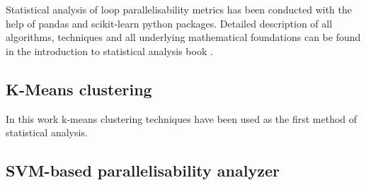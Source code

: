 \qquad Statistical analysis of loop parallelisability metrics has been conducted with the help of pandas \cite{python-lib-pandas} and scikit-learn \cite{python-lib-scikit-learn} python packages. Detailed description of all algorithms, techniques and all underlying mathematical foundations can be found in the introduction to statistical analysis book \cite{statistical-learning-book}.

\subsection{K-Means clustering}

\qquad In this work k-means clustering techniques have been used as the first method of statistical analysis.




\subsection{SVM-based parallelisability analyzer}
